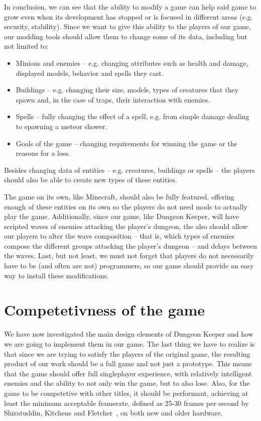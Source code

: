 In conclusion, we can see that the ability to modify a game can help said game to grow even when its development has stopped
or is focused in different areas (e.g. security, stability). Since we want to give this ability to the players of
our game, our modding tools should allow them to change some of its data, including but not limited to:

\begin{itemize}
    \item Minions and enemies -- e.g. changing attributes such as health and damage, displayed models, behavior and spells they
        cast.
    \item Buildings -- e.g. changing their size, models, types of creatures that they spawn and, in the case of traps, their interaction with
        enemies.
    \item Spells -- fully changing the effect of a spell, e.g. from simple damage dealing to spawning a meteor shower.
    \item Goals of the game -- changing requirements for winning the game or the reasons for a loss.
\end{itemize}

Besides changing data of entities -- e.g. creatures, buildings or spells -- the players should also be able to create new types of these
entities.

The game on its own, like Minecraft, should also be fully featured, offering enough of these entities
on its own so the players do not need mods to actually play the game. Additionally, since our game, like Dungeon Keeper,
will have scripted waves of enemies attacking the player's dungeon, the also should allow our players to alter the wave 
composition -- that is, which types of enemies compose the different groups attacking the player's dungeon --  and delays between
the waves. Last, but not least, we must not forget that players do not necessarily have to be (and often are not)
programmers, so our game should provide an easy way to install these modifications.

\section{Competetivness of the game}

We have now investigated the main design elements of Dungeon Keeper and how we are going 
to implement them in our game. The last thing we have to realize is that since we are trying to satisfy the players of the original
game, the resulting product of our work should be a full game and not just a prototype. This means that the game should offer full 
singleplayer experience, with relatively intelligent enemies and the ability to not only win the game, but to also lose. 
Also, for the game to be competetive with other titles,
it should be performant, achieving at least the minimum acceptable framerate, defined as 25-30 frames per second by 
Shiratuddin, Kitchens and Fletcher~\cite{AcceptableFPS}, on both new and older hardware.

